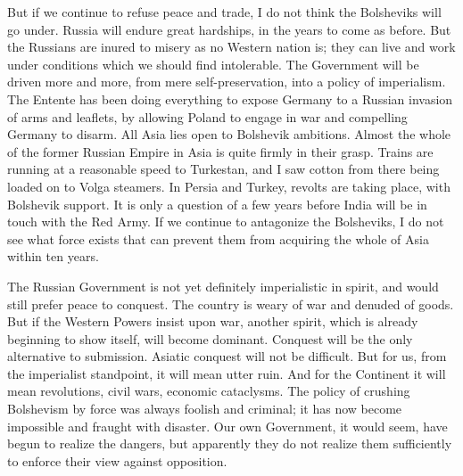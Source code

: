 But if we continue to refuse peace and trade, I do not think the Bolsheviks will go under. Russia will endure great hardships, in the years to come as before. But the Russians are inured to misery as no Western nation is; they can live and work under conditions which we should find intolerable. The Government will be driven more and more, from mere self-preservation, into a policy of imperialism. The Entente has been doing everything to expose Germany to a Russian invasion of arms and leaflets, by allowing Poland to engage in war and compelling Germany to disarm. All Asia lies open to Bolshevik ambitions. Almost the whole of the former Russian Empire in Asia is quite firmly in their grasp. Trains are running at a reasonable speed to Turkestan, and I saw cotton from there being loaded on to Volga steamers. In Persia and Turkey, revolts are taking place, with Bolshevik support. It is only a question of a few years before India will be in touch with the Red Army. If we continue to antagonize the Bolsheviks, I do not see what force exists that can prevent them from acquiring the whole of Asia within ten years.

The Russian Government is not yet definitely imperialistic in spirit, and would still prefer peace to conquest. The country is weary of war and denuded of goods. But if the Western Powers insist upon war, another spirit, which is already beginning to show itself, will become dominant. Conquest will be the only alternative to submission. Asiatic conquest will not be difficult. But for us, from the imperialist standpoint, it will mean utter ruin. And for the Continent it will mean revolutions, civil wars, economic cataclysms. The policy of crushing Bolshevism by force was always foolish and criminal; it has now become impossible and fraught with disaster. Our own Government, it would seem, have begun to realize the dangers, but apparently they do not realize them sufficiently to enforce their view against opposition.


